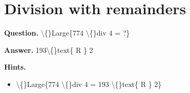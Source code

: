 \documentclass{article}
\begin{document}
\section*{Division with remainders}
\textbf{Question.} \textbackslash\{\}Large\{774 \textbackslash\{\}div  4 = ?\}

\textbf{Answer.} 193\textbackslash\{\}text\{ R \}
                        2

\textbf{Hints.}
\begin{itemize}
  \item \textbackslash\{\}Large\{774 \textbackslash\{\}div 4 = 193 \textbackslash\{\}text\{ R \} 2\}
\end{itemize}
\end{document}
